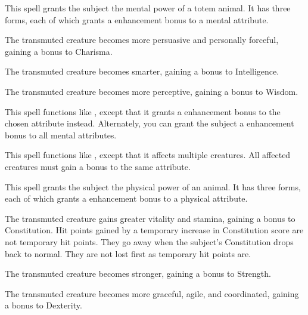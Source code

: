 \spellrng{\rngtouch}
\spelldur{\durshort}
\begin{spelleffect}
  This spell grants the subject the mental power of a totem animal. It has three forms, each of which grants a  enhancement bonus to a mental attribute.
  \par {} The transmuted creature becomes more persuasive and personally forceful, gaining a bonus to Charisma.
  \par {} The transmuted creature becomes smarter, gaining a bonus to Intelligence.
  \par {} The transmuted creature becomes more perceptive, gaining a bonus to Wisdom.
\end{spelleffect}

\begin{spelleffect}
    This spell functions like , except that it grants a  enhancement bonus to the chosen attribute instead. Alternately, you can grant the subject a  enhancement bonus to all mental attributes.
\end{spelleffect}

\spellrng{\rngmed}
\begin{spelleffect}
  This spell functions like , except that it affects multiple creatures. All affected creatures must gain a bonus to the same attribute.
\end{spelleffect}

\spellrng{\rngtouch}
\spelldur{\durshort}
\begin{spelleffect}
  This spell grants the subject the physical power of an animal. It has three forms, each of which grants a  enhancement bonus to a physical attribute.
  \par {} The transmuted creature gains greater vitality and stamina, gaining a bonus to Constitution. Hit points gained by a temporary increase in Constitution score are not temporary hit points. They go away when the subject's Constitution drops back to normal. They are not lost first as temporary hit points are.
  \par {} The transmuted creature becomes stronger, gaining a bonus to Strength.
  \par {} The transmuted creature becomes more graceful, agile, and coordinated, gaining a bonus to Dexterity.
\end{spelleffect}

